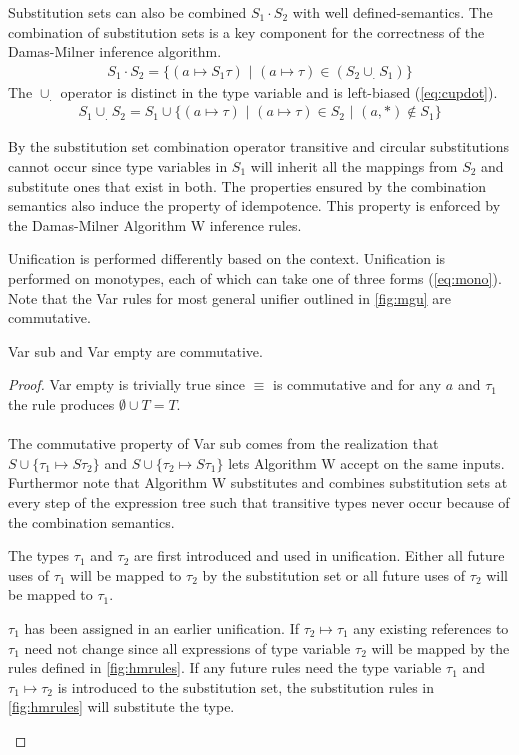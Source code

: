 \documentclass[11pt,oneside,a4paper]{report}
\begin{document}
Substitution sets can also be combined $S_1 \cdot S_2$ with well defined-semantics.
The combination of substitution sets is a key component for the correctness of the Damas-Milner inference algorithm.
\begin{align}
    S_1 \cdot S_2 = \{ (a \mapsto S_1\tau) \,\,|\,\, (a \mapsto \tau) \in (S_2 \cup_. S_1) \}
    \label{eq:combination}
\end{align}
The $\cup_.$ operator is distinct in the type variable and is left-biased (\autoref{eq:cupdot}).
\begin{align}
    S_1 \cup_. S_2 = S_1 \cup \{ (a \mapsto \tau) \,\,|\,\, (a \mapsto \tau) \in S_2 \,\,|\,\, (a, *) \notin S_1 \}
    \label{eq:cupdot}
\end{align}
\begin{remark}
By the substitution set combination operator transitive and circular substitutions cannot occur since type variables in $S_1$ will inherit all the mappings from $S_2$ and substitute ones that exist in both.
The properties ensured by the combination semantics also induce the property of idempotence.
This property is enforced by the Damas-Milner Algorithm W inference rules.
\end{remark}
Unification is performed differently based on the context.
Unification is performed on monotypes, each of which can take one of three forms (\autoref{eq:mono}).
Note that the Var rules for most general unifier outlined in \autoref{fig:mgu} are commutative.
\begin{lemma}
	Var sub and Var empty are commutative.
\end{lemma}
\begin{proof}
	Var empty is trivially true since $\equiv$ is commutative and for any $a$ and $\tau_1$ the rule produces $\emptyset \cup T = T$.\\\\
    The commutative property of Var sub comes from the realization that $S \cup \{ \tau_1 \mapsto S\tau_2 \}$ and $S \cup \{ \tau_2 \mapsto S\tau_1 \}$ lets Algorithm W accept on the same inputs.
    Furthermor note that Algorithm W substitutes and combines substitution sets at every step of the expression tree such that transitive types never occur because of the combination semantics.
    \begin{case}
        The types $\tau_1$ and $\tau_2$ are first introduced and used in unification.
        Either all future uses of $\tau_1$ will be mapped to $\tau_2$ by the substitution set or all future uses of $\tau_2$ will be mapped to $\tau_1$.
    \end{case}
    \begin{case}
        $\tau_1$ has been assigned in an earlier unification.
        If $\tau_2 \mapsto \tau_1$ any existing references to $\tau_1$ need not change since all expressions of type variable $\tau_2$ will be mapped by the rules defined in \autoref{fig:hmrules}.
        If any future rules need the type variable $\tau_1$ and $\tau_1 \mapsto \tau_2$ is introduced to the substitution set, the substitution rules in \autoref{fig:hmrules} will substitute the type.
    \end{case}
\end{proof}
\end{document}
